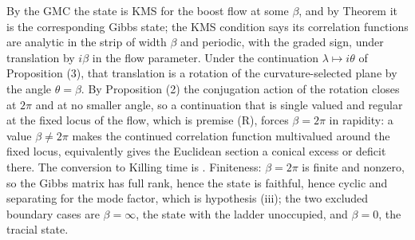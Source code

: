 By the GMC the state is KMS for the boost flow at some $\beta$, and by Theorem  it is the corresponding Gibbs state; the KMS condition says its correlation functions are analytic in the strip of width $\beta$ and periodic, with the graded sign, under translation by $i\beta$ in the flow parameter. Under the continuation $\lambda \mapsto i\theta$ of Proposition (3), that translation is a rotation of the curvature-selected plane by the angle $\theta = \beta$. By Proposition (2) the conjugation action of the rotation closes at $2\pi$ and at no smaller angle, so a continuation that is single valued and regular at the fixed locus of the flow, which is premise (R), forces $\beta = 2\pi$ in rapidity: a value $\beta \neq 2\pi$ makes the continued correlation function multivalued around the fixed locus, equivalently gives the Euclidean section a conical excess or deficit there. The conversion to Killing time is \cite[Prop.~6.2]{ButlerT5}. Finiteness: $\beta = 2\pi$ is finite and nonzero, so the Gibbs matrix has full rank, hence the state is faithful, hence cyclic and separating for the mode factor, which is hypothesis (iii); the two excluded boundary cases are $\beta = \infty$, the state with the ladder unoccupied, and $\beta = 0$, the tracial state.
